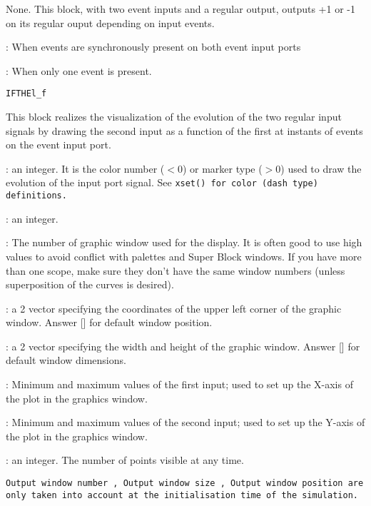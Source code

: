 %
%


\label{ANDLOGf}

None.
This block, with two event inputs and a regular output,
outputs +1 or -1 on its regular ouput depending on input events. 
\begin{scitem}
\item[{\verb?+1?}]
:
When events are synchronously present on both event input ports
\item[{\verb?-1?}]
:
When only one event is present.
\end{scitem}%
{\verb?IFTHEl_f?} \pageref{IFTHElf}
%
%


\label{ANIMXYf}

This block realizes the visualization of the evolution of the two
regular input signals by drawing the second input as a function of
the first at instants of events on the event input port.
\begin{scitem}
\item[{\verb?Curve colors?}]
: an integer. It is the color number ($<$0)
or marker type ($>$0) used to draw the evolution of the input port
signal. See %
\tt xset() %
\rm for color (dash type) definitions.
\item[{\verb?Line or mark size?}]
: an integer. 
\item[{\verb?Output window number?}]
: The number of graphic window used for the display. It is often good
to use high values to avoid conflict with palettes and Super Block
windows. If you have more than one scope, make sure they don't have
the same window numbers (unless superposition of the curves is
desired).
\item[{\verb?Output window position?}]
: a 2 vector specifying the coordinates of the upper left corner of
the graphic window. Answer [] for default window position.
\item[{\verb?Output window size?}]
: a 2 vector specifying the width and height  of 
the graphic window. Answer [] for default window dimensions.
\item[{\verb?Xmin, Xmax?}]
: Minimum and maximum values of the first input; used to set up the X-axis
of the plot in the graphics window.
\item[{\verb?Ymin, Ymax?}]
: Minimum and maximum values of the second input; used to set up the 
Y-axis of the plot in the graphics window.
\item[{\verb?Buffer size?}]
: an integer. The number of points visible at any time.
\end{scitem}%
%
\tt Output window number%
\rm , %
\tt Output window size%
\rm , %
\tt Output window
position %
\rm are only taken into account at the initialisation time of the
simulation. 


